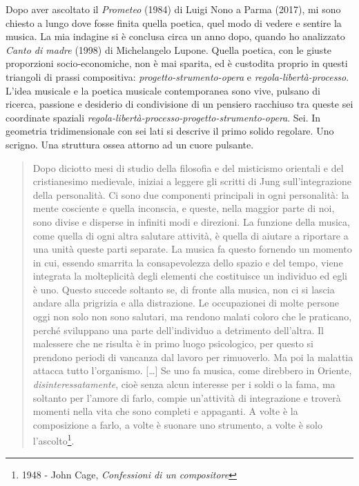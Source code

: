 Dopo aver ascoltato il \emph{Prometeo} (1984) di Luigi Nono a Parma (2017), mi sono chiesto a lungo
dove fosse finita quella poetica,
quel modo di vedere e sentire la musica. La mia indagine si è conclusa circa un anno dopo, quando ho
analizzato \emph{Canto di madre} (1998) di Michelangelo Lupone.
Quella poetica, con le giuste proporzioni socio-economiche,
non è mai sparita, ed è custodita proprio in questi triangoli di prassi compositiva: \emph{progetto-strumento-opera}
e \emph{regola-libertà-processo}. L'idea musicale e la poetica musicale contemporanea
sono vive, pulsano di ricerca, passione e desiderio di condivisione di un pensiero
racchiuso tra queste sei coordinate spaziali \emph{regola-libertà-processo-progetto-strumento-opera}.
Sei. In geometria tridimensionale con sei lati si descrive il primo solido regolare. Uno scrigno.
Una struttura ossea attorno ad un cuore pulsante.

\begin{quote}
  Dopo diciotto mesi di studio della filosofia e del misticismo orientali e del
  cristianesimo medievale, iniziai a leggere gli scritti di Jung sull'integrazione
  della personalità. Ci sono due componenti principali in ogni personalità:
  la mente cosciente e quella inconscia, e queste, nella maggior parte di noi,
  sono divise e disperse in infiniti modi e direzioni. La funzione della musica,
  come quella di ogni altra salutare attività, è quella di aiutare a riportare a
  una unità queste parti separate. La musica fa questo fornendo un momento in cui,
  essendo smarrita la consapevolezza dello spazio e del tempo, viene integrata la
  molteplicità degli elementi che costituisce un individuo ed egli è uno. Questo succede
  soltanto se, di fronte alla musica, non ci si lascia andare alla prigrizia e alla distrazione.
  Le occupazionei di molte persone oggi non solo non sono salutari, ma rendono malati coloro
  che le praticano, perché sviluppano una parte dell'individuo a detrimento dell'altra.
  Il malessere che ne risulta è in primo luogo psicologico, per questo si prendono periodi
  di vancanza dal lavoro per rimuoverlo. Ma poi la malattia attacca tutto l'organismo.
  [\ldots] Se uno fa musica, come direbbero in Oriente, \emph{disinteressatamente}, cioè
  senza alcun interesse per i soldi o la fama, ma soltanto per l'amore di farlo,
  compie un'attività di integrazione e troverà momenti nella vita che sono completi e
  appaganti. A volte è la composizione a farlo, a volte è suonare uno strumento, a
  volte è solo l'ascolto\footnote{1948 - John Cage, \emph{Confessioni di un compositore}}.
\end{quote}


